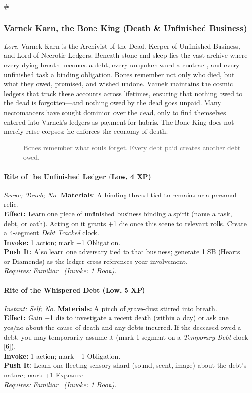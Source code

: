# %

\subsubsection{Varnek Karn, the Bone King (Death \& Unfinished Business)}
\textit{Lore.} Varnek Karn is the Archivist of the Dead, Keeper of Unfinished Business, and Lord of Necrotic Ledgers. Beneath stone and sleep lies the vast archive where every dying breath becomes a debt, every unspoken word a contract, and every unfinished task a binding obligation. Bones remember not only who died, but what they owed, promised, and wished undone. Varnek maintains the cosmic ledgers that track these accounts across lifetimes, ensuring that nothing owed to the dead is forgotten—and nothing owed by the dead goes unpaid. Many necromancers have sought dominion over the dead, only to find themselves entered into Varnek's ledgers as payment for hubris. The Bone King does not merely raise corpses; he enforces the economy of death.

\begin{quote}
Bones remember what souls forget. Every debt paid creates another debt owed.
\end{quote}

\paragraph*{Rite of the Unfinished Ledger (Low, 4 XP)} \emph{Scene; Touch; No.}
\textbf{Materials:} A binding thread tied to remains or a personal relic.\\
\textbf{Effect:} Learn one piece of unfinished business binding a spirit (name a task, debt, or oath). Acting on it grants +1 die once this scene to relevant rolls. Create a 4-segment \emph{Debt Tracked} clock.\\
\textbf{Invoke:} 1 action; mark +1 Obligation.\\
\textbf{Push It:} Also learn one adversary tied to that business; generate 1 SB (Hearts or Diamonds) as the ledger cross-references your involvement.\\
\emph{Requires: Familiar \ (\textit{Invoke:} 1 Boon).}

\paragraph*{Rite of the Whispered Debt (Low, 5 XP)} \emph{Instant; Self; No.}
\textbf{Materials:} A pinch of grave-dust stirred into breath.\\
\textbf{Effect:} Gain +1 die to investigate a recent death (within a day) or ask one yes/no about the cause of death and any debts incurred. If the deceased owed a debt, you may temporarily assume it (mark 1 segment on a \emph{Temporary Debt} clock [6]).\\
\textbf{Invoke:} 1 action; mark +1 Obligation.\\
\textbf{Push It:} Learn one fleeting sensory shard (sound, scent, image) about the debt's nature; mark +1 Exposure.\\
\emph{Requires: Familiar \ (\textit{Invoke:} 1 Boon).}

